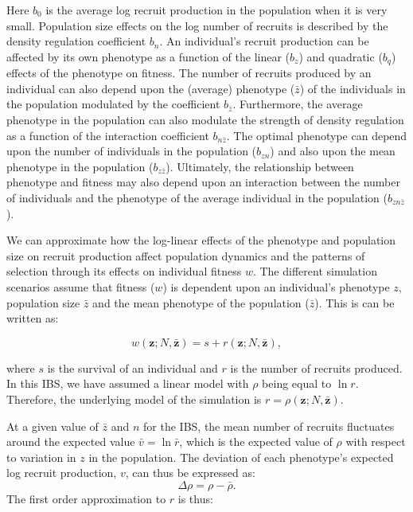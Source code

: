 \documentclass{article}
\begin{document}
		\noindent Here $b_0$ is the average log recruit production in the population when it is very small. Population size effects on the log number of recruits is described by the density regulation coefficient $b_{n}$. An individual's recruit production can be affected by its own phenotype as a function of the linear ($b_z$) and quadratic ($b_q$) effects of the phenotype on fitness. The number of recruits produced by an individual can also depend upon the (average) phenotype ($\bar{z}$) of the individuals in the population modulated by the coefficient $b_{\bar{z}}$. Furthermore, the average phenotype in the population can also modulate the strength of density regulation as a function of the interaction coefficient $b_{n\bar{z}}$. The optimal phenotype can depend upon the number of individuals in the population ($b_{zn}$) and also upon the mean phenotype in the population ($b_{z\bar{z}}$). Ultimately, the relationship between phenotype and fitness may also depend upon an interaction between the number of individuals and the phenotype of the average individual in the population ($b_{zn\bar{z}}$).
		
		We can approximate how the log-linear effects of the phenotype and population size on recruit production affect population dynamics and the patterns of selection through its effects on individual fitness $w$. The different simulation scenarios assume that fitness ($w$) is dependent upon an individual's phenotype $z$, population size $\bar{z}$ and the mean phenotype of the population ($\bar{z}$). This is can be written as:
		  		
		\begin{equation}
		w(\bm z; N,\bar{\bm z})= s+ r(\bm z; N,\bar{\bm z}),  \tag{A1.2}
		\end{equation}
		
		\noindent where	$s$  is the survival of an individual and $r$ is the number of recruits produced. In this IBS, we have assumed a linear model with $\rho$ being equal to $\ln r$. Therefore, the underlying model of the simulation is $r=\rho(\bm z; N,\bar{\bm z}).$
		
		At a given value of  $\bar{z}$ and $n$ for the IBS, the mean number of recruits fluctuates around the expected value $\bar{v}=\ln \bar{r}$, which is the expected value of $\rho$ with respect to variation in $z$ in the population. The deviation of each phenotype's expected log recruit production, $v$, can thus be expressed as:
		\begin{equation}
		\Delta \rho=\rho-\bar{\rho}. \tag{A1.3} 
		\end{equation}
		The first order approximation to $r$ is thus: 
		
\end{document}
